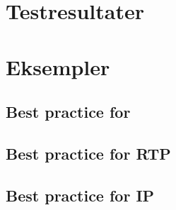 \chapter{Testresultater}
\thispagestyle{empty}


\newpage



\chapter{Eksempler}
\section{Best practice for \des}




\section{Best practice for RTP}  

\section{Best practice for IP}  


